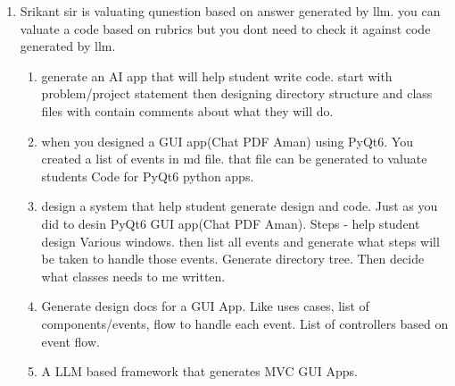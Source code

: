 \begin{enumerate}
\begin{enumerate}
				\item automatic question generation during exam based on current answered questions. Increase level.
				\item Use lang-graph to valuate practical exam: read --> understand --> generate_unit_tests --> save_tests --> run_tests --> report
				\item Use lang-graph to generate practical exam to refactor or remove a error from code: read --> identify_issues --> refactor --> verify_changes --> report
				\item Use lang graph to find bug : read --> analyze --> find_bugs --> rank_by_severity --> report
				\item Use lang graph to generate coding explanation : read --> understand --> explain_functions --> explain_flow --> summary
				\item Use lang graph to Code Review : read --> review --> suggest_fixes --> report
				\item give me more  ideas for langchain based coding ideas specially for academic valuation
			\end{enumerate}
		\item Srikant sir is valuating qunestion based on answer generated by llm. you can valuate a code based on rubrics but you dont need to check it against code generated by llm.
			\begin{enumerate}
				\item generate an AI app that will help student write code. start with problem/project statement then designing directory structure and class files with contain comments about what they will do.
				\item when you designed a GUI app(Chat PDF Aman) using PyQt6. You created a list of events in md file. that file can be generated to valuate students Code for  PyQt6 python apps.
				\item design a system that help student generate design and code. Just as you did to desin PyQt6 GUI app(Chat PDF Aman). Steps - help student design Various windows. then list all events and generate what steps will be taken to handle those events. Generate directory tree. Then decide what classes needs to me written. 
				\item Generate design docs for a GUI App. Like uses cases, list of components/events, flow to handle each event. List of controllers based on event flow.
				\item A LLM based framework that generates MVC GUI Apps.
			\end{enumerate}     

\end{enumerate}
